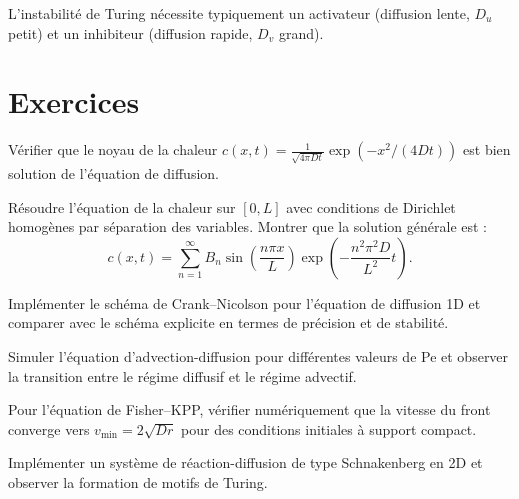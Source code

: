 \begin{remarque}
L'instabilit\'e de Turing n\'ecessite typiquement un activateur
(diffusion lente, $D_u$ petit) et un inhibiteur (diffusion rapide,
$D_v$ grand).
\end{remarque}

\section{Exercices}

\begin{exercice}
V\'erifier que le noyau de la chaleur
$c(x,t)=\frac{1}{\sqrt{4\pi Dt}}\exp(-x^2/(4Dt))$ est bien
solution de l'\'equation de diffusion.
\end{exercice}

\begin{exercice}
R\'esoudre l'\'equation de la chaleur sur $[0,L]$ avec conditions
de Dirichlet homog\`enes par s\'eparation des variables.  Montrer
que la solution g\'en\'erale est :
\[
  c(x,t) = \sum_{n=1}^\infty B_n \sin\!\left(\frac{n\pi x}{L}\right)
  \exp\!\left(-\frac{n^2\pi^2 D}{L^2}t\right).
\]
\end{exercice}

\begin{exercice}
Impl\'ementer le sch\'ema de Crank--Nicolson pour l'\'equation de
diffusion 1D et comparer avec le sch\'ema explicite en termes de
pr\'ecision et de stabilit\'e.
\end{exercice}

\begin{exercice}
Simuler l'\'equation d'advection-diffusion pour diff\'erentes valeurs
de Pe et observer la transition entre le r\'egime diffusif et le
r\'egime advectif.
\end{exercice}

\begin{exercice}
Pour l'\'equation de Fisher--KPP, v\'erifier num\'eriquement que la
vitesse du front converge vers $v_{\min}=2\sqrt{Dr}$ pour des
conditions initiales \`a support compact.
\end{exercice}

\begin{exercice}
Impl\'ementer un syst\`eme de r\'eaction-diffusion de type
Schnakenberg en 2D et observer la formation de motifs de Turing.
\end{exercice}
